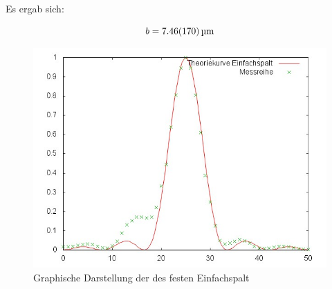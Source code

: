 		Es ergab sich:

		\begin{equation}
			b = \SI{7.46 (170)}{\micro \meter}
		\end{equation}

		

		\begin{figure}[h]
			\centering
			\includegraphics[width = 14cm]{graph1.jpg}
			\caption{Graphische Darstellung der des festen Einfachspalt}
			\label{graph1}
		\end{figure}